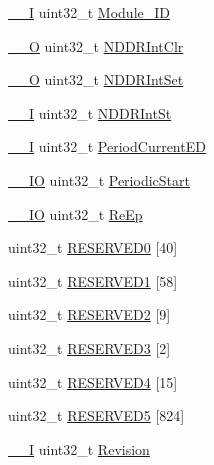 \begin{DoxyCompactItemize}
\item 
\hyperlink{core__cm3_8h_af63697ed9952cc71e1225efe205f6cd3}{\+\_\+\+\_\+I} uint32\+\_\+t \hyperlink{structLPC__USB__T_a0cb48fd6b5b916dd404cfb1acc2e9e95}{Module\+\_\+\+ID}
\item 
\hyperlink{core__cm3_8h_a7e25d9380f9ef903923964322e71f2f6}{\+\_\+\+\_\+O} uint32\+\_\+t \hyperlink{structLPC__USB__T_a5d7ced93bcfade2997201bf6f8652163}{N\+D\+D\+R\+Int\+Clr}
\item 
\hyperlink{core__cm3_8h_a7e25d9380f9ef903923964322e71f2f6}{\+\_\+\+\_\+O} uint32\+\_\+t \hyperlink{structLPC__USB__T_af1c9974ab3c4d76a457f777ab688d58f}{N\+D\+D\+R\+Int\+Set}
\item 
\hyperlink{core__cm3_8h_af63697ed9952cc71e1225efe205f6cd3}{\+\_\+\+\_\+I} uint32\+\_\+t \hyperlink{structLPC__USB__T_a375c36061f5d778987c905a593ab22aa}{N\+D\+D\+R\+Int\+St}
\item 
\hyperlink{core__cm3_8h_af63697ed9952cc71e1225efe205f6cd3}{\+\_\+\+\_\+I} uint32\+\_\+t \hyperlink{structLPC__USB__T_ac160f7c461c044798d0fe75a3e3f6703}{Period\+Current\+ED}
\item 
\hyperlink{core__cm3_8h_aec43007d9998a0a0e01faede4133d6be}{\+\_\+\+\_\+\+IO} uint32\+\_\+t \hyperlink{structLPC__USB__T_a6b53482287440bea02ba8d8db7c9aae8}{Periodic\+Start}
\item 
\hyperlink{core__cm3_8h_aec43007d9998a0a0e01faede4133d6be}{\+\_\+\+\_\+\+IO} uint32\+\_\+t \hyperlink{structLPC__USB__T_a97c7cd00d79bec77ea186893f70d985b}{Re\+Ep}
\item 
uint32\+\_\+t \hyperlink{structLPC__USB__T_a3aff3a8e76053fa15333e688e8056969}{R\+E\+S\+E\+R\+V\+E\+D0} \mbox{[}40\mbox{]}
\item 
uint32\+\_\+t \hyperlink{structLPC__USB__T_a5ceee0a1fa85f9d1cd515dac7c649015}{R\+E\+S\+E\+R\+V\+E\+D1} \mbox{[}58\mbox{]}
\item 
uint32\+\_\+t \hyperlink{structLPC__USB__T_af783a91fcb65afd51f312c8d7ee17faf}{R\+E\+S\+E\+R\+V\+E\+D2} \mbox{[}9\mbox{]}
\item 
uint32\+\_\+t \hyperlink{structLPC__USB__T_a89802335cc487853dceb4ae91aa73718}{R\+E\+S\+E\+R\+V\+E\+D3} \mbox{[}2\mbox{]}
\item 
uint32\+\_\+t \hyperlink{structLPC__USB__T_a7eca62c20542b29cf41a58284f8312d3}{R\+E\+S\+E\+R\+V\+E\+D4} \mbox{[}15\mbox{]}
\item 
uint32\+\_\+t \hyperlink{structLPC__USB__T_abcb46c9afd665765603f695918bd1bc8}{R\+E\+S\+E\+R\+V\+E\+D5} \mbox{[}824\mbox{]}
\item 
\hyperlink{core__cm3_8h_af63697ed9952cc71e1225efe205f6cd3}{\+\_\+\+\_\+I} uint32\+\_\+t \hyperlink{structLPC__USB__T_aa3eac0d60e5474925416501b67c27936}{Revision}

\end{DoxyCompactItemize}
